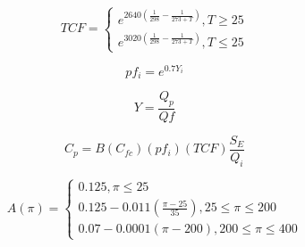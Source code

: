 \begin{equation}
\label{eq:TCF}
TCF =
\begin{cases}
e^{2640(\frac{1}{298}- \frac{1}{273+T})} , T\geq25 \\
e^{3020(\frac{1}{298}- \frac{1}{273+T})} , T\leq25
\end{cases}
\end{equation}

\begin{equation}
\label{eq:polfac}
pf_{i} = e^{0.7Y_{i}}
\end{equation}

\begin{equation}
\label{eq:recov}
Y= \frac{Q_{p}}{Q{f}}
\end{equation}

\begin{equation}
\label{eq:permC}
C_{p}=B(C_{fc})({pf_{i}})(TCF)\frac{S_{E}}{Q_{i}}
\end{equation}

\begin{equation}
\label{eq:permability}
A(\pi) =
\begin{cases} 
0.125 , \pi \leq 25 \\
0.125-0.011(\frac{\pi - 25}{35}) , 25 \leq \pi \leq 200 \\ 
0.07-0.0001(\pi-200) , 200 \leq \pi \leq 400  
\end{cases}
\end{equation}

